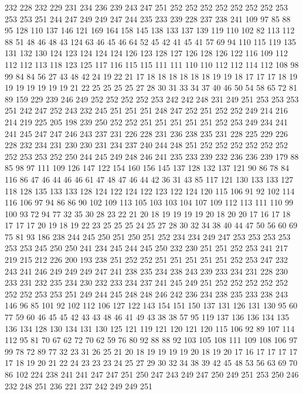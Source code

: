 232 228 232 229 231 234 236 239 243 247 251 252 252 252 252 252 252 252 253 253
253 251 244 247 249 249 247 244 235 233 239 228 237 238 241 109 97 85 88 95
128 110 137 146 121 169 164 158 145 138 133 137 139 119 110 102 82 113 112 88
51 48 46 48 43 124 63 46 45 46 64 52 45 42 41 45 41 57 69 94
110 115 119 135 131 132 130 124 123 124 124 124 126 123 128 127 126 128 126 122
116 109 112 112 112 113 118 123 125 117 116 115 115 111 111 110 110 112 112 114
112 108 98 99 84 84 56 27 43 48 42 24 19 22 21 17 18 18 18 18
18 18 19 19 18 17 17 17 18 19 19 19 19 19 19 19 21 22 25 25
25 25 27 28 30 31 33 34 37 40 46 50 54 58 65 72 81 89 159 229
239 246 249 252 252 252 252 253 242 242 248 231 249 251 253 253 253 251 242 247
252 243 232 245 251 251 251 248 247 252 251 252 252 249 214 216 214 219 225 205
198 239 250 252 252 251 251 251 251 251 252 253 249 234 241 241 245 247 247 246
243 237 231 226 228 231 236 238 235 231 228 225 229 226 228 232 234 231 230 230
231 234 237 240 244 248 251 252 252 252 252 252 252 252 253 253 252 250 244 245
249 248 246 241 235 233 239 232 236 236 239 179 88 85 98 97 111 109 126 147
122 154 160 156 145 137 128 132 137 121 90 86 78 84 116 86 47 46 44 46
46 61 47 48 47 46 44 42 36 31 43 85 117 121 130 133 133 127 118 128
135 133 133 128 124 122 124 122 123 122 124 120 115 106 91 92 102 114 116 106
97 94 86 86 90 102 109 113 105 103 103 104 107 109 112 113 111 110 99 100
93 72 94 77 32 35 30 28 23 22 21 20 18 19 19 19 19 20 18 20
20 17 16 17 18 17 17 17 20 19 18 19 22 23 25 25 25 24 25 27
28 30 32 34 38 40 44 47 50 56 60 69 75 81 93 186 238 244 245 250
251 250 251 252 234 234 249 247 253 253 253 253 253 253 245 250 250 241 234 245
244 245 250 232 230 251 251 252 253 241 217 219 215 212 226 200 193 238 251 252
252 251 251 251 251 251 252 253 247 232 243 241 246 249 249 249 247 241 238 235
234 238 243 239 233 234 231 228 230 233 231 232 235 234 230 232 233 234 237 241
245 249 251 252 252 252 252 252 252 252 253 253 251 249 244 245 248 248 246 242
236 234 238 235 233 238 243 146 96 85 101 92 102 112 106 127 122 143 154 151
150 137 131 126 131 130 95 60 77 59 60 46 45 45 42 43 43 48 46 41
49 43 38 38 57 95 119 137 136 136 134 135 136 134 128 130 134 131 130 125
121 119 121 120 121 120 115 106 92 89 107 114 112 95 81 70 67 62 72 70
62 59 76 80 92 88 88 92 103 105 108 111 109 108 106 97 99 78 72 89
77 32 23 31 26 25 21 20 18 19 19 19 19 20 18 19 20 17 16 17
17 17 17 17 18 19 20 21 22 24 23 23 23 24 25 27 29 30 32 34
38 39 42 45 48 53 56 63 69 70 86 102 224 238 241 241 247 247 251 250
247 243 249 247 250 249 251 253 250 246 232 248 251 236 221 237 242 249 249 251
